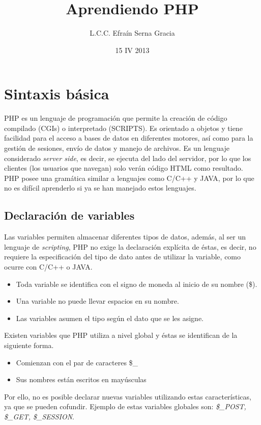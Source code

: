 \documentclass[12pt,spanish,twocolumn,lettersize]{article}
\title{Aprendiendo PHP}
\author{L.C.C. Efra\'in Serna Gracia}
\date{15 IV 2013}
\begin{document}
\maketitle

\section{Sintaxis b\'asica}
PHP es un lenguaje de programaci\'on que permite la creaci\'on de c\'odigo compilado (CGIs) o interpretado (SCRIPTS). Es orientado a objetos y tiene facilidad para el acceso a bases de datos en diferentes motores, as\'i como para la gesti\'on de sesiones, env\'io de datos y manejo de archivos. Es un lenguaje considerado \emph{server side}, es decir, se ejecuta del lado del servidor, por lo que los clientes (los usuarios que navegan) solo ver\'an c\'odigo HTML como resultado.\\
PHP posee una gram\'atica similar a lenguajes como C/C++ y JAVA, por lo que no es dif\'icil aprenderlo si ya se han manejado estos lenguajes.

\subsection{Declaraci\'on de variables}
Las variables permiten almacenar diferentes tipos de datos, adem\'as, al ser un lenguaje de \emph{scripting}, PHP no exige la declaraci\'on expl\'icita de \'estas, es decir, no requiere la especificaci\'on del tipo de dato antes de utilizar la variable, como ocurre con C/C++ o JAVA.
\begin{itemize}
\item Toda variable se identifica con el signo de moneda al inicio de su nombre (\$).
\item Una variable no puede llevar espacios en su nombre.
\item Las variables asumen el tipo seg\'un el dato que se les asigne.
\end{itemize}
Existen variables que PHP utiliza a nivel global y \'estas se identifican de la siguiente forma.
\begin{itemize}
\item Comienzan con el par de caracteres \$\_
\item Sus nombres est\'an escritos en may\'usculas
\end{itemize}
Por ello, no es posible declarar nuevas variables utilizando estas caracter\'isticas, ya que se pueden cofundir. Ejemplo de estas variables globales son: \emph{\$\_POST, \$\_GET, \$\_SESSION}.
\end{document}
